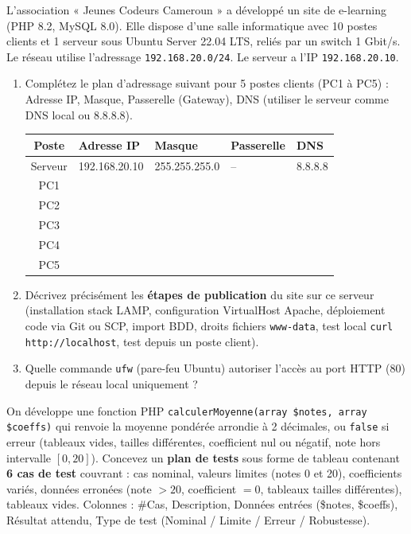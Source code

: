 \documentclass[11pt]{article}
\begin{document}
\begin{exercice}
L'association « Jeunes Codeurs Cameroun » a développé un site de e-learning (PHP 8.2, MySQL 8.0). Elle dispose d'une salle informatique avec 10 postes clients et 1 serveur sous Ubuntu Server 22.04 LTS, reliés par un switch 1 Gbit/s. Le réseau utilise l'adressage \texttt{192.168.20.0/24}. Le serveur a l'IP \texttt{192.168.20.10}.
\begin{enumerate}
    \item Complétez le plan d'adressage suivant pour 5 postes clients (PC1 à PC5) : Adresse IP, Masque, Passerelle (Gateway), DNS (utiliser le serveur comme DNS local ou 8.8.8.8).
    \begin{center}
    \begin{tabularx}{\linewidth}{|c|X|X|X|X|}\hline
    \rowcolor{popblueL} \textbf{Poste} & \textbf{Adresse IP} & \textbf{Masque} & \textbf{Passerelle} & \textbf{DNS} \\\hline
    Serveur & 192.168.20.10 & 255.255.255.0 & -- & 8.8.8.8 \\\hline
    PC1 & & & & \\\hline
    PC2 & & & & \\\hline
    PC3 & & & & \\\hline
    PC4 & & & & \\\hline
    PC5 & & & & \\\hline
    \end{tabularx}
    \end{center}
    \item Décrivez précisément les \textbf{étapes de publication} du site sur ce serveur (installation stack LAMP, configuration VirtualHost Apache, déploiement code via Git ou SCP, import BDD, droits fichiers \texttt{www-data}, test local \texttt{curl http://localhost}, test depuis un poste client).
    \item Quelle commande \texttt{ufw} (pare-feu Ubuntu) autoriser l'accès au port HTTP (80) depuis le réseau local uniquement ?
\end{enumerate}
\end{exercice}

\begin{exercice}
On développe une fonction PHP \texttt{calculerMoyenne(array \$notes, array \$coeffs)} qui renvoie la moyenne pondérée arrondie à 2 décimales, ou \texttt{false} si erreur (tableaux vides, tailles différentes, coefficient nul ou négatif, note hors intervalle $[0, 20]$).
Concevez un \textbf{plan de tests} sous forme de tableau contenant \textbf{6 cas de test} couvrant : cas nominal, valeurs limites (notes 0 et 20), coefficients variés, données erronées (note $>20$, coefficient $=0$, tableaux tailles différentes), tableaux vides. Colonnes : \#Cas, Description, Données entrées (\$notes, \$coeffs), Résultat attendu, Type de test (Nominal / Limite / Erreur / Robustesse).
\end{exercice}
\end{document}
